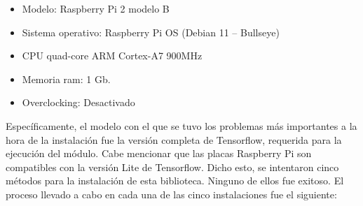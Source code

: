 \begin{itemize}
	\item Modelo: Raspberry Pi 2 modelo B
	\item Sistema operativo: Raspberry Pi OS (Debian 11 – Bullseye)
	\item CPU quad-core ARM Cortex-A7 900MHz
	\item Memoria ram: 1 Gb.
	\item Overclocking: Desactivado

\end{itemize}

Específicamente, el modelo con el que se tuvo los problemas más importantes a la hora de la instalación fue la versión completa de Tensorflow, requerida para la ejecución del módulo. Cabe mencionar que las placas Raspberry Pi son compatibles con la versión Lite de Tensorflow. Dicho esto, se intentaron cinco métodos para la instalación de esta biblioteca. Ninguno de ellos fue exitoso. El proceso llevado a cabo en cada una de las cinco instalaciones fue el siguiente:

